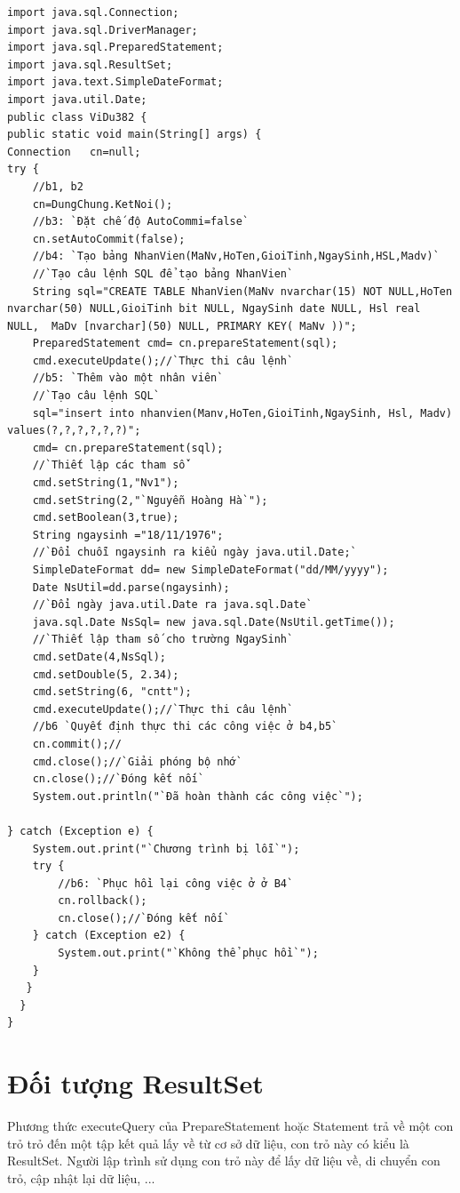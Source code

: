 \begin{lstlisting}[escapechar=`]
import java.sql.Connection;
import java.sql.DriverManager;
import java.sql.PreparedStatement;
import java.sql.ResultSet;
import java.text.SimpleDateFormat;
import java.util.Date;
public class ViDu382 {
public static void main(String[] args) {
Connection   cn=null;
try { 
	//b1, b2
	cn=DungChung.KetNoi();
	//b3: `Đặt chế độ AutoCommi=false`
	cn.setAutoCommit(false);
	//b4: `Tạo bảng NhanVien(MaNv,HoTen,GioiTinh,NgaySinh,HSL,Madv)`
	//`Tạo câu lệnh SQL để tạo bảng NhanVien`
	String sql="CREATE TABLE NhanVien(MaNv nvarchar(15) NOT NULL,HoTen nvarchar(50) NULL,GioiTinh bit NULL,	NgaySinh date NULL,	Hsl real NULL,	MaDv [nvarchar](50) NULL, PRIMARY KEY( MaNv ))";
	PreparedStatement cmd= cn.prepareStatement(sql);
	cmd.executeUpdate();//`Thực thi câu lệnh`
	//b5: `Thêm vào một nhân viên`
	//`Tạo câu lệnh SQL`
	sql="insert into nhanvien(Manv,HoTen,GioiTinh,NgaySinh, Hsl, Madv) values(?,?,?,?,?,?)";
	cmd= cn.prepareStatement(sql);
	//`Thiết lập các tham số`
	cmd.setString(1,"Nv1");
	cmd.setString(2,"`Nguyễn Hoàng Hà`");
	cmd.setBoolean(3,true);
	String ngaysinh ="18/11/1976";
	//`Đổi chuỗi ngaysinh ra kiểu ngày java.util.Date;`
	SimpleDateFormat dd= new SimpleDateFormat("dd/MM/yyyy");
	Date NsUtil=dd.parse(ngaysinh);
	//`Đổi ngày java.util.Date ra java.sql.Date`
	java.sql.Date NsSql= new java.sql.Date(NsUtil.getTime());
	//`Thiết lập tham số cho trường NgaySinh` 
	cmd.setDate(4,NsSql);
	cmd.setDouble(5, 2.34);
	cmd.setString(6, "cntt");
	cmd.executeUpdate();//`Thực thi câu lệnh`
	//b6 `Quyết định thực thi các công việc ở b4,b5`
	cn.commit();//
	cmd.close();//`Giải phóng bộ nhớ`
	cn.close();//`Đóng kết nối`
	System.out.println("`Đã hoàn thành các công việc`");

} catch (Exception e) {
	System.out.print("`Chương trình bị lỗi`");
	try { 
		//b6: `Phục hồi lại công việc ở ở B4`
		cn.rollback();
		cn.close();//`Đóng kết nối`
	} catch (Exception e2) {
		System.out.print("`Không thể phục hồi`");
	}
   }
  }
}
\end{lstlisting}


\section{Đối tượng ResultSet}
Phương thức executeQuery của PrepareStatement hoặc Statement trả về một con trỏ trỏ đến một tập kết quả lấy về từ cơ sở dữ liệu, con trỏ này có kiểu là ResultSet. Người lập trình sử dụng con trỏ này để lấy dữ liệu về, di chuyển con trỏ, cập nhật lại dữ liệu, ...

